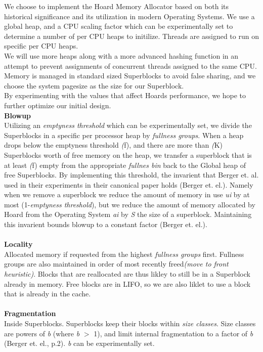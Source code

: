 \documentclass{article}
\begin{document}
\indent \indent We choose to implement the Hoard Memory Allocator based on both its historical significance and its utilization in modern Operating Systems.  We use a global heap, and a CPU scaling factor which can be experimentally set to determine a number of per CPU heaps to initilize.  Threads are assigned to run on specific per CPU heaps.  
\\
\indent We will use more heaps along with a more advanced hashing function in an attempt to prevent assignments of concurrent threads assigned to the same CPU.  Memory is managed in standard sized Superblocks to avoid false sharing, and we choose the system pagesize as the size for our Superblock.
\\
\indent By experimenting with the values that affect Hoards performance, we hope to further optimize our initial design.
\\
\newpage
\noindent
\textbf{Blowup}
\\
\indent  Utilizing an \textit{emptyness threshold} which can be experimentally set, we divide the Superblocks in a specific per processor heap by \textit{fullness groups}.  When a heap drops below the emptyness threshold \textit(f), and there are more than \textit(K) Superblocks worth of free memory on the heap, we transfer a superblock that is at least \textit(f) empty from the appropriate \textit{fullnes bin} back to the Global heap of free Superblocks.  By implementing this threshold, the invarient that Berger et. al. used in their experiments in their canonical paper holds (Berger et. el.).  Namely when we remove a superblock we reduce the amount of memory in use \textit{ui} by at most (1-\textit{emptyness threshold}), but we reduce the amount of memory allocated by Hoard from the Operating System \textit{ai} by \textit{S} the size of a superblock.   Maintaining this invarient bounds blowup to a constant factor (Berger et. el.).  
\\
\\
\textbf{Locality}
\\
\indent Allocated memory if requested from the highest \textit{fullness groups} first.  Fullness groups are also maintained in order of most recently freed\textit{(move to front heuristic)}.  Blocks that are reallocated are thus likley to still be in a Superblock already in memory.  Free blocks are in LIFO, so we are also liklet to use a block that is already in the cache.
\\
\\
\textbf{Fragmentation}
\\
\indent Inside Superblocks.  Superblocks keep their blocks within \textit{size classes}.  Size classes are powers of \textit{b} (where \textit{b} $>$ 1), and limit internal fragmentation to a factor of \textit{b} (Berger et. el., p.2). \textit{b} can be experimentally set.  
\end{document}

